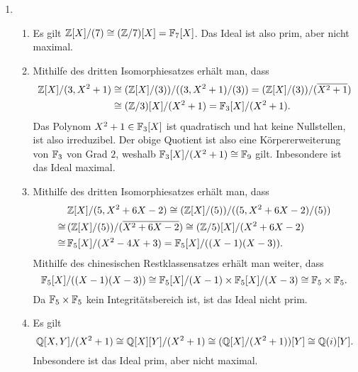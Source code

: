 \begin{solution}
\begin{enumerate}
    \item
      \begin{enumerate}[leftmargin=*]
        \item
          Es gilt $\mathbb{Z}[X]/(7) \cong (\mathbb{Z}/7)[X] = \mathbb{F}_7[X]$.
          Das Ideal ist also prim, aber nicht maximal.
        \item
          Mithilfe des dritten Isomorphiesatzes erhält man, dass
          \begin{align*}
                    \mathbb{Z}[X]/(3, X^2 + 1)
            &\cong  ( \mathbb{Z}[X]/(3) ) / ( (3, X^2 + 1) / (3) )
             =      ( \mathbb{Z}[X]/(3) ) / ( \overline{X^2 + 1} )
            \\
            &\cong  (\mathbb{Z}/3)[X] / (X^2 + 1)
             =      \mathbb{F}_3[X] / (X^2 + 1).
          \end{align*}
          Das Polynom $X^2 +1 \in \mathbb{F}_3[X]$ ist quadratisch und hat keine Nullstellen, ist also irreduzibel.
          Der obige Quotient ist also eine Körpererweiterung von $\mathbb{F}_3$ von Grad $2$, weshalb $\mathbb{F}_3[X] / (X^2 + 1) \cong \mathbb{F}_9$ gilt.
          Inbesondere ist das Ideal maximal.
        \item
          Mithilfe des dritten Isomorphiesatzes erhält man, dass
          \begin{align*}
                 &\,  \mathbb{Z}[X]/(5, X^2 + 6X - 2)
            \cong     (\mathbb{Z}[X]/(5)) / ((5, X^2 + 6X - 2)/(5))
          \\
            \cong&\,  (\mathbb{Z}[X]/(5)) / (\overline{X^2 + 6X - 2})
            \cong     (\mathbb{Z}/5)[X] / (X^2 + 6X -2)
          \\
            \cong&\,  \mathbb{F}_5[X] / (X^2 - 4X + 3)
            =         \mathbb{F}_5[X] / ( (X-1) (X-3) ).
          \end{align*}
          Mithilfe des chinesischen Restklassensatzes erhält man weiter, dass
          \[
                  \mathbb{F}_5[X] / ( (X-1)(X-3))
            \cong \mathbb{F}_5[X]/(X-1) \times \mathbb{F}_5[X]/(X-3)
            \cong \mathbb{F}_5 \times \mathbb{F}_5.
          \]
          Da $\mathbb{F}_5 \times \mathbb{F}_5$ kein Integritätsbereich ist, ist das Ideal nicht prim.
        \item
          Es gilt
          \[
                  \mathbb{Q}[X,Y]/(X^2 + 1)
            \cong \mathbb{Q}[X][Y]/(X^2 + 1)
            \cong (\mathbb{Q}[X]/(X^2 + 1))[Y]
            \cong \mathbb{Q}(i)[Y].
          \]
          Inbesondere ist das Ideal prim, aber nicht maximal.
      \end{enumerate}
  \end{enumerate}
\end{solution}


